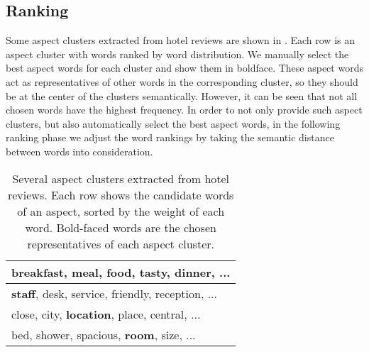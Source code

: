 \subsection{Ranking}
\label{sec:ranking}



Some aspect clusters extracted from hotel reviews are shown in .
Each row is an aspect cluster with words ranked by word distribution.
We manually select the best aspect words for each cluster and show them in boldface.
These aspect words act as representatives of other words in the corresponding cluster,
 so they should be at the center of the clusters semantically.
However, it can be seen that not all chosen words have the highest frequency.
In order to not only provide such aspect clusters, 
but also automatically select the best aspect words,
in the following ranking phase we adjust the word rankings by taking the semantic
distance between words into consideration.

\begin{table}[t]
\centering
\begin{tabular}{|l|} \hline
breakfast, meal, \textbf{food}, tasty, dinner, ... \\\hline
\textbf{staff}, desk, service, friendly, reception, ... \\\hline
close, city, \textbf{location}, place, central, ... \\\hline
bed, shower, spacious, \textbf{room}, size, ... \\\hline
\hline
\end{tabular}
\caption{Several aspect clusters extracted from hotel reviews.
  Each row shows the candidate words of an aspect, sorted by the weight of each word. 
Bold-faced words are the chosen representatives of each aspect cluster.}
\label{table:cluster_example}
\end{table}

